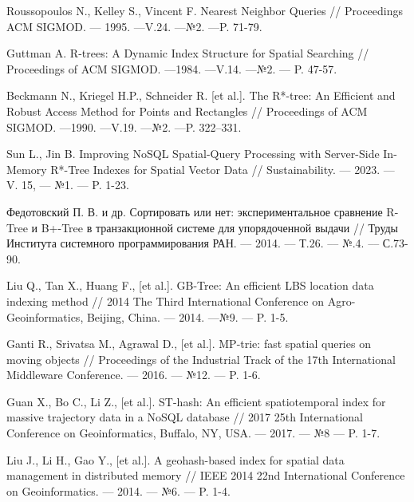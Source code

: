 %




\begin{thebibliography}{99}

Roussopoulos N., Kelley S., Vincent F. Nearest Neighbor Queries // Proceedings ACM SIGMOD. --- 1995. ---V.24. ---№2. ---P. 71-79.

Guttman A. R-trees: A Dynamic Index Structure for Spatial Searching // Proceedings of ACM SIGMOD. ---1984. ---V.14. ---№2. --- P. 47-57.

Beckmann N., Kriegel H.P., Schneider R. [et al.]. The R*-tree: An Efficient and Robust Access Method for Points and Rectangles // Proceedings of ACM SIGMOD. ---1990. ---V.19. ---№2. ---P. 322–331.

Sun L., Jin B. Improving NoSQL Spatial-Query Processing with Server-Side In-Memory R*-Tree Indexes for Spatial Vector Data // Sustainability. --- 2023. --- V. 15, --- №1. --- P. 1-23. 

Федотовский П. В. и др. Сортировать или нет: экспериментальное сравнение R-Tree и B+-Tree в транзакционной системе для упорядоченной выдачи // Труды Института системного программирования РАН. –-- 2014. –-- Т.26. –-- №.4. –-- С.73-90.


Liu Q., Tan X., Huang F., [et al.]. GB-Tree: An efficient LBS location data indexing method // 2014 The Third International Conference on Agro-Geoinformatics, Beijing, China. --- 2014. ---№9. --- P. 1-5.

Ganti R., Srivatsa M., Agrawal D., [et al.]. MP-trie: fast spatial queries on moving objects // Proceedings of the Industrial Track of the 17th International Middleware Conference. --- 2016. --- №12. --- P. 1-6.

Guan X., Bo C., Li Z., [et al.]. ST-hash: An efficient spatiotemporal index for massive trajectory data in a NoSQL database //  2017 25th International Conference on Geoinformatics, Buffalo, NY, USA. --- 2017. --- №8 --- P. 1-7.

Liu J., Li H., Gao Y., [et al.]. A geohash-based index for spatial data management in distributed memory // IEEE 2014 22nd International Conference on Geoinformatics. --- 2014. --- №6. --- P. 1-4.


\end{thebibliography}
